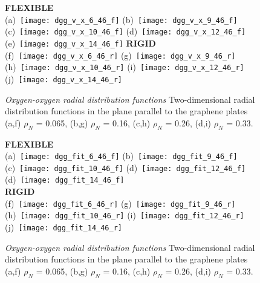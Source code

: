 \documentclass[12pt]{article}
\begin{document}
\begin{figure}[h!]
	\centering
	\textbf{FLEXIBLE} \\
	(a)~\texttt{[image: dgg\_v\_x\_6\_46\_f]} 
	(b)~\texttt{[image: dgg\_v\_x\_9\_46\_f]}
	(c)~\texttt{[image: dgg\_v\_x\_10\_46\_f]}
	(d)~\texttt{[image: dgg\_v\_x\_12\_46\_f]}
	(e)~\texttt{[image: dgg\_v\_x\_14\_46\_f]}
	\textbf{RIGID} \\
	(f)~\texttt{[image: dgg\_v\_x\_6\_46\_r]} 
	(g)~\texttt{[image: dgg\_v\_x\_9\_46\_r]}
	(h)~\texttt{[image: dgg\_v\_x\_10\_46\_r]}
	(i)~\texttt{[image: dgg\_v\_x\_12\_46\_r]}
	(j)~\texttt{[image: dgg\_v\_x\_14\_46\_r]}
	\vspace{-10pt}
	\caption{\textit{Oxygen-oxygen radial distribution functions} Two-dimensional radial distribution functions in the plane parallel to the graphene plates (a,f) \(\rho_N\) = 0.065, (b,g) \(\rho_N\) = 0.16, (c,h) \(\rho_N\) = 0.26, (d,i) \(\rho_N\) = 0.33.}
	\label{fig:density_vs_dgg}
\end{figure}

\begin{figure}[h!]
	\centering
	\textbf{FLEXIBLE} \\
	(a)~\texttt{[image: dgg\_fit\_6\_46\_f]} 
	(b)~\texttt{[image: dgg\_fit\_9\_46\_f]}
	(c)~\texttt{[image: dgg\_fit\_10\_46\_f]}
	(d)~\texttt{[image: dgg\_fit\_12\_46\_f]}
	(d)~\texttt{[image: dgg\_fit\_14\_46\_f]} \\
	\textbf{RIGID} \\
	(f)~\texttt{[image: dgg\_fit\_6\_46\_r]} 
	(g)~\texttt{[image: dgg\_fit\_9\_46\_r]}
	(h)~\texttt{[image: dgg\_fit\_10\_46\_r]}
	(i)~\texttt{[image: dgg\_fit\_12\_46\_r]}
	(j)~\texttt{[image: dgg\_fit\_14\_46\_r]}
	\vspace{-10pt}
	\caption{\textit{Oxygen-oxygen radial distribution functions} Two-dimensional radial distribution functions in the plane parallel to the graphene plates (a,f) \(\rho_N\) = 0.065, (b,g) \(\rho_N\) = 0.16, (c,h) \(\rho_N\) = 0.26, (d,i) \(\rho_N\) = 0.33.}
	\label{fig:dgg_distribution}
\end{figure}
\end{document}
